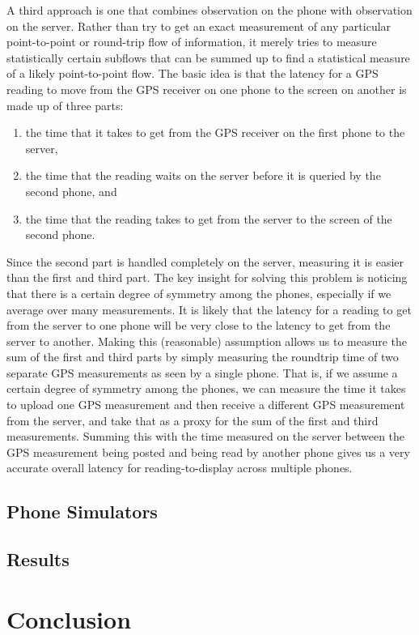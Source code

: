 \documentclass{acm_proc_article-sp}
\begin{document}
A third approach is one that combines observation on the phone with observation on the server.  Rather than try to get an exact measurement of any particular point-to-point or round-trip flow of information, it merely tries to measure statistically certain subflows that can be summed up to find a statistical measure of a likely point-to-point flow.  The basic idea is that the latency for a GPS reading to move from the GPS receiver on one phone to the screen on another is made up of three parts:
\begin{enumerate}
\item the time that it takes to get from the GPS receiver on the first phone to the server,
\item the time that the reading waits on the server before it is queried by the second phone, and
\item the time that the reading takes to get from the server to the screen of the second phone.
\end{enumerate}
Since the second part is handled completely on the server, measuring it is easier than the first and third part.  The key insight for solving this problem is noticing that there is a certain degree of symmetry among the phones, especially if we average over many measurements.  It is likely that the latency for a reading to get from the server to one phone will be very close to the latency to get from the server to another.  Making this (reasonable) assumption allows us to measure the sum of the first and third parts by simply measuring the roundtrip time of two separate GPS measurements as seen by a single phone.  That is, if we assume a certain degree of symmetry among the phones, we can measure the time it takes to upload one GPS measurement and then receive a different GPS measurement from the server, and take that as a proxy for the sum of the first and third measurements.  Summing this with the time measured on the server between the GPS measurement being posted and being read by another phone gives us a very accurate overall latency for reading-to-display across multiple phones.

\subsection{Phone Simulators}
\subsection{Results}

\section{Conclusion}


\end{document}
